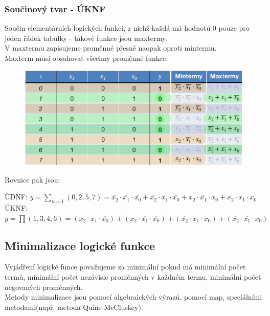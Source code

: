 \subsubsection*{Součinový tvar - ÚKNF}
Součin elementárních logických funkcí, z nichž každá má hodnotu 0 pouze pro jeden řádek tabulky - takové funkce jsou maxtermy.\\
V maxtermu zapisujeme proměnné přesně naopak oproti mintermu.\\
Maxterm musí obsahovat všechny proměnné funkce.\\
\newpage
\begin{figure}
    \centering
    \includegraphics*[scale = 0.4]{img/Tvary.png}
\end{figure}
Rovnice pak jsou:
\begin{center}
    ÚDNF: \(y=\sum_{n = 1}(0,2,5,7)= \overline{x_2} \cdot \overline{x_1} \cdot \overline{x_0} + \overline{x_2} \cdot x_1 \cdot \overline{x_0} + x_2 \cdot \overline{x_1} \cdot x_0 + x_2 \cdot x_1 \cdot x_0 \)\\
    ÚKNF: \(y = \prod (1,3,4,6) = (x_2 \cdot x_1 \cdot \overline{x_0}) + (x_2 \cdot \overline{x_1} \cdot \overline{x_0}) + (\overline{x_2} \cdot x_1 \cdot x_0) + (\overline{x_2} \cdot \overline{x_1} \cdot x_0)\)
\end{center}
\subsection{Minimalizace logické funkce}
Vyjádření logické funce považujeme za minimální pokud má minimální počet termů, minimální počet nezávisle proměnných v každném termu, minimální počet negovaných proměnných.\\
Metody minimalizace jsou pomocí algebraických výrazů, pomocí map, speciálními metodami(např. metoda Quine-McCluskey).\\
